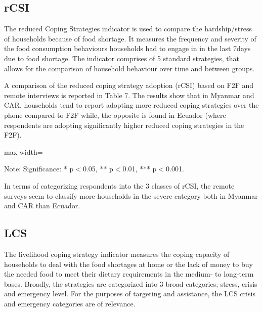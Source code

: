 \documentclass[11pt,harvard]{article}
\begin{document}
		\pagebreak
		
\subsection{rCSI}

The reduced Coping Strategies indicator is used to compare the hardship/stress of households because of food shortage. It measures the frequency and severity of the food consumption behaviours households had to engage in in the last 7days due to food shortage. The indicator comprises of 5 standard strategies, that allows for the comparison of household behaviour over time and between groups.

A comparison of the reduced coping strategy adoption (rCSI) based on F2F and remote interviews is reported in Table 7. The results show that in Myanmar and CAR, households tend to report adopting more reduced coping strategies over the phone compared to F2F while, the opposite is found in Ecuador (where respondents are adopting significantly higher reduced coping strategies in the F2F).

\begin{table}[htbp]
	\centering
	\begin{adjustbox}{max width=\textwidth}
		\begin{threeparttable}
			\caption{Impact of Survey Modality on Reduced Coping Strategy Index Classification}
			\scriptsize
			 
			\label{tab:rCSI_Modality_All_Country}
			\begin{tablenotes}
				\item Note: Significance: * p$<$0.05, ** p$<$0.01, *** p$<$0.001. 
			\end{tablenotes}
		\end{threeparttable}
	\end{adjustbox}
\end{table}

In terms of categorizing respondents into the 3 classes of rCSI, the remote surveys seem to classify more households in the severe category both in Myanmar and CAR than Ecuador.

	\pagebreak

\subsection{LCS}

The livelihood coping strategy indicator measures the coping capacity of households to deal with the food shortages at home or the lack of money to buy the needed food to meet their dietary requirements in the medium- to long-term bases. Broadly, the strategies are categorized into 3 broad categories; stress, crisis and emergency level. For the purposes of targeting and assistance, the LCS crisis and emergency categories are of relevance. 
\end{document}
